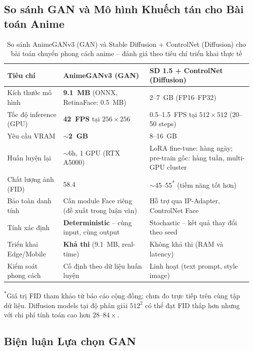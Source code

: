 \subsection{So sánh GAN và Mô hình Khuếch tán cho Bài toán Anime}
\label{subsec:gan_vs_diffusion}

\begin{table}[H]
\caption{So sánh AnimeGANv3 (GAN) và Stable Diffusion + ControlNet (Diffusion) cho bài toán chuyển phong cách anime -- đánh giá theo tiêu chí triển khai thực tế}
\label{tab:gan_vs_diffusion}
\centering
\begin{tabular}{|p{3.2cm}|p{4.5cm}|p{5.8cm}|}
\hline
\textbf{Tiêu chí} & \textbf{AnimeGANv3 (GAN)} & \textbf{SD 1.5 + ControlNet (Diffusion)} \\
\hline
Kích thước mô hình & \textbf{9.1~MB} (ONNX, RetinaFace: 0.5~MB) & 2--7~GB (FP16--FP32) \\
\hline
Tốc độ inference (GPU) & \textbf{42~FPS} tại $256 \times 256$ & 0.5--1.5~FPS tại $512 \times 512$ (20--50 steps) \\
\hline
Yêu cầu VRAM & \textbf{$\sim$2~GB} & 8--16~GB \\
\hline
Huấn luyện lại & $\sim$6h, 1 GPU (RTX A5000) & LoRA fine-tune: hàng ngày; pre-train gốc: hàng tuần, multi-GPU cluster \\
\hline
Chất lượng ảnh (FID) & 58.4 & $\sim$45--55\textsuperscript{*} (tiềm năng tốt hơn) \\
\hline
Bảo toàn danh tính & Cần module Face riêng (đề xuất trong luận văn) & Hỗ trợ qua IP-Adapter, ControlNet Face \\
\hline
Tính xác định & \textbf{Deterministic} -- cùng input, cùng output & Stochastic -- kết quả thay đổi theo seed \\
\hline
Triển khai Edge/Mobile & \textbf{Khả thi} (9.1~MB, real-time) & Không khả thi (RAM và latency) \\
\hline
Kiểm soát phong cách & Cố định theo dữ liệu huấn luyện & Linh hoạt (text prompt, style image) \\
\hline
\end{tabular}
\vspace{0.3em}

\noindent\textsuperscript{*}Giá trị FID tham khảo từ báo cáo cộng đồng; chưa đo trực tiếp trên cùng tập dữ liệu. Diffusion models tại độ phân giải $512^2$ có thể đạt FID thấp hơn nhưng với chi phí tính toán cao hơn $28$--$84\times$.
\end{table}

\subsection{Biện luận Lựa chọn GAN}
\label{subsec:gan_justification}

